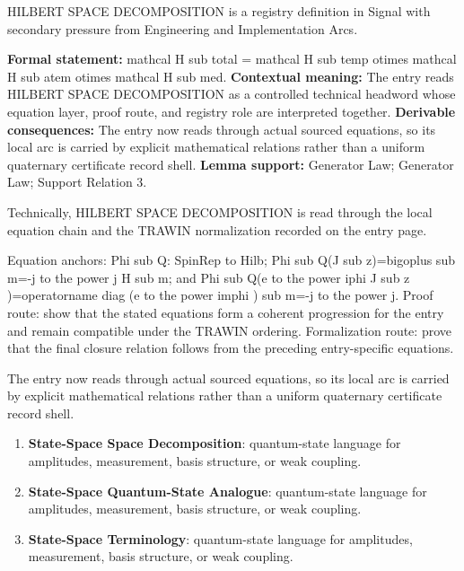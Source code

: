 
\begingroup\small
{}
HILBERT SPACE DECOMPOSITION is a registry definition in Signal with secondary pressure from Engineering and Implementation Arcs.

\begingroup\footnotesize\setlength{\emergencystretch}{3em}\sloppy
\textbf{Formal statement:} mathcal H sub total = mathcal H sub temp otimes mathcal H sub atem otimes mathcal H sub med. \textbf{Contextual meaning:} The entry reads HILBERT SPACE DECOMPOSITION as a controlled technical headword whose equation layer, proof route, and registry role are interpreted together. \textbf{Derivable consequences:} The entry now reads through actual sourced equations, so its local arc is carried by explicit mathematical relations rather than a uniform quaternary certificate record shell. \textbf{Lemma support:} Generator Law; Generator Law; Support Relation 3.\par
\endgroup

Technically, HILBERT SPACE DECOMPOSITION is read through the local equation chain and the TRAWIN normalization recorded on the entry page.

Equation anchors: Phi sub Q: SpinRep to Hilb; Phi sub Q(J sub z)=bigoplus sub m=-j to the power j H sub m; and Phi sub Q(e to the power iphi J sub z )=operatorname diag (e to the power imphi ) sub m=-j to the power j. Proof route: show that the stated equations form a coherent progression for the entry and remain compatible under the TRAWIN ordering. Formalization route: prove that the final closure relation follows from the preceding entry-specific equations.

The entry now reads through actual sourced equations, so its local arc is carried by explicit mathematical relations rather than a uniform quaternary certificate record shell.
\endgroup

\begin{enumerate}[leftmargin=1.6em,itemsep=6pt,topsep=4pt]
\item \textbf{State-Space Space Decomposition}: quantum-state language for amplitudes, measurement, basis structure, or weak coupling.
\item \textbf{State-Space Quantum-State Analogue}: quantum-state language for amplitudes, measurement, basis structure, or weak coupling.
\item \textbf{State-Space Terminology}: quantum-state language for amplitudes, measurement, basis structure, or weak coupling.
\end{enumerate}

